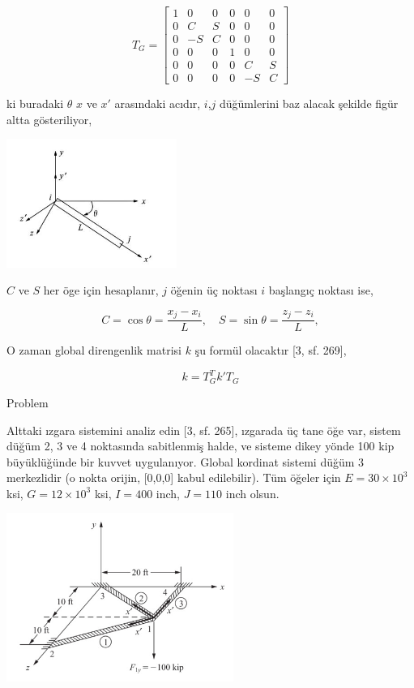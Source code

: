 \documentclass[12pt,fleqn]{article}\usepackage{../../common}
\begin{document}
$$
T_G = \left[\begin{array}{cccccc}
1 & 0 & 0 & 0 & 0 & 0 \\
0 & C & S & 0 & 0 & 0 \\ 
0 & -S & C & 0 & 0 & 0 \\ 
0 & 0 & 0 & 1 & 0 & 0 \\ 
0 & 0 & 0 & 0 & C & S \\ 
0 & 0 & 0 & 0 & -S & C 
\end{array}\right]
$$

ki buradaki $\theta$ $x$ ve $x'$ arasındaki acıdır, $i$,$j$ düğümlerini baz
alacak şekilde figür altta gösteriliyor,

\includegraphics[width=15em]{compscieng_bpp43fem_05.jpg}

$C$ ve $S$ her öge için hesaplanır, $j$ öğenin üç noktası $i$ başlangıç
noktası ise,

$$
C = \cos\theta = \frac{x_j - x_i}{L}, \quad
S = \sin\theta = \frac{z_j - z_i}{L},
$$

O zaman global direngenlik matrisi $k$ şu formül olacaktır [3, sf. 269],

$$
k = T_G^T k' T_G
$$

Problem

Alttaki ızgara sistemini analiz edin [3, sf. 265], ızgarada üç tane öğe var,
sistem düğüm 2, 3 ve 4 noktasında sabitlenmiş halde, ve sisteme dikey yönde 100
kip büyüklüğünde bir kuvvet uygulanıyor. Global kordinat sistemi düğüm 3
merkezlidir (o nokta orijin, [0,0,0] kabul edilebilir).  Tüm öğeler için $E = 30
\times 10^3$ ksi, $G = 12 \times 10^3$ ksi, $I = 400$ inch, $J = 110$ inch
olsun.

\includegraphics[width=20em]{compscieng_bpp43fem_06.jpg}
\end{document}
